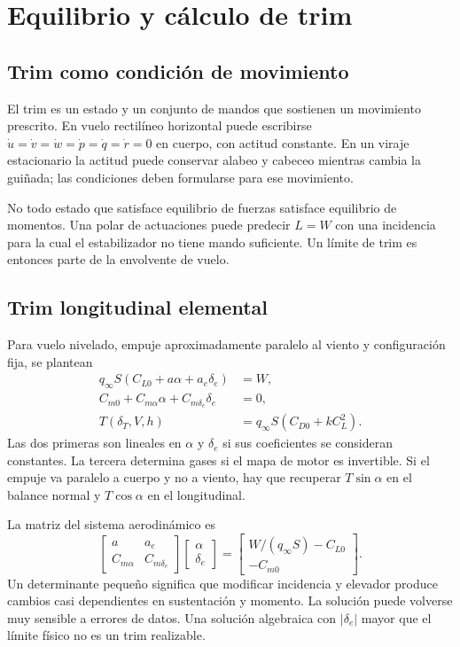 \chapter{Equilibrio y cálculo de trim}\label{ch:trim}

\section{Trim como condición de movimiento}
El trim es un estado y un conjunto de mandos que sostienen un movimiento prescrito. En vuelo rectilíneo horizontal puede escribirse $\dot u=\dot v=\dot w=\dot p=\dot q=\dot r=0$ en cuerpo, con actitud constante. En un viraje estacionario la actitud puede conservar alabeo y cabeceo mientras cambia la guiñada; las condiciones deben formularse para ese movimiento.

No todo estado que satisface equilibrio de fuerzas satisface equilibrio de momentos. Una polar de actuaciones puede predecir $L=W$ con una incidencia para la cual el estabilizador no tiene mando suficiente. Un límite de trim es entonces parte de la envolvente de vuelo.

\section{Trim longitudinal elemental}
Para vuelo nivelado, empuje aproximadamente paralelo al viento y configuración fija, se plantean
\begin{align}
q_\infty S(C_{L0}+a\alpha+a_e\delta_e)&=W,\\
C_{m0}+C_{m\alpha}\alpha+C_{m\delta_e}\delta_e&=0,\\
T(\delta_T,V,h)&=q_\infty S\left(C_{D0}+kC_L^2\right).
\label{eq:trim-simple}
\end{align}
Las dos primeras son lineales en $\alpha$ y $\delta_e$ si sus coeficientes se consideran constantes. La tercera determina gases si el mapa de motor es invertible. Si el empuje va paralelo a cuerpo y no a viento, hay que recuperar $T\sin\alpha$ en el balance normal y $T\cos\alpha$ en el longitudinal.

La matriz del sistema aerodinámico es
\begin{equation}
\begin{bmatrix}a&a_e\\C_{m\alpha}&C_{m\delta_e}\end{bmatrix}
\begin{bmatrix}\alpha\\\delta_e\end{bmatrix}=
\begin{bmatrix}W/(q_\infty S)-C_{L0}\\-C_{m0}\end{bmatrix}.
\end{equation}
Un determinante pequeño significa que modificar incidencia y elevador produce cambios casi dependientes en sustentación y momento. La solución puede volverse muy sensible a errores de datos. Una solución algebraica con $|\delta_e|$ mayor que el límite físico no es un trim realizable.

